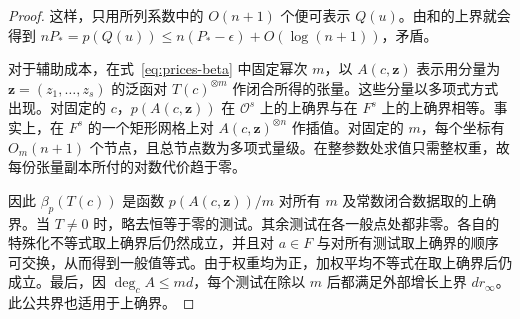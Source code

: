 \begin{proof}
这样，只用所列系数中的 $O(n+1)$ 个便可表示 $Q(u)$。由和的上界就会得到 $nP_*=p(Q(u))\le n(P_*-\epsilon)+O(\log(n+1))$，矛盾。

对于辅助成本，在式~\eqref{eq:prices-beta} 中固定幂次 $m$，以 $A(c,\mathbf z)$ 表示用分量为 $\mathbf z=(z_1,\ldots,z_s)$ 的泛函对 $T(c)^{\otimes m}$ 作闭合所得的张量。这些分量以多项式方式出现。对固定的 $c$，$p(A(c,\mathbf z))$ 在 $\mathcal O^s$ 上的上确界与在 $F^s$ 上的上确界相等。事实上，在 $F^s$ 的一个矩形网格上对 $A(c,\mathbf z)^{\otimes n}$ 作插值。对固定的 $m$，每个坐标有 $O_m(n+1)$ 个节点，且总节点数为多项式量级。在整参数处求值只需整权重，故每份张量副本所付的对数代价趋于零。

因此 $\beta_p(T(c))$ 是函数 $p(A(c,\mathbf z))/m$ 对所有 $m$ 及常数闭合数据取的上确界。当 $T\ne0$ 时，略去恒等于零的测试。其余测试在各一般点处都非零。各自的特殊化不等式取上确界后仍然成立，并且对 $a\in F$ 与对所有测试取上确界的顺序可交换，从而得到一般值等式。由于权重均为正，加权平均不等式在取上确界后仍成立。最后，因 $\deg_c A\le md$，每个测试在除以 $m$ 后都满足外部增长上界 $d r_\infty$。此公共界也适用于上确界。
\end{proof}
